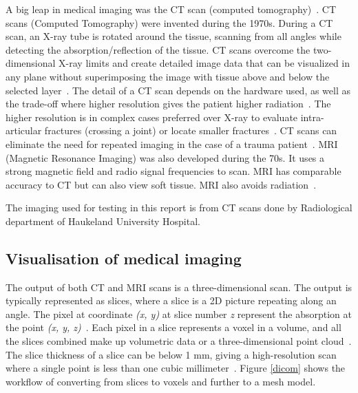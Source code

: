 \documentclass[a4paper]{report}
\begin{document}
A big leap in medical imaging was the CT scan (computed tomography)~\cite{bradley_history_2008}.
CT scans (Computed Tomography) were invented during the 1970s. During a CT scan, an X-ray tube is rotated around the tissue, scanning from all angles while detecting the absorption/reflection of the tissue. CT scans overcome the two-dimensional X-ray limits and create detailed image data that can be visualized in any plane without superimposing the image with tissue above and below the selected layer~\cite{hamblen_outline_2010}. The detail of a CT scan depends on the hardware used, as well as the trade-off where higher resolution gives the patient higher radiation~\cite{bradley_history_2008}. The higher resolution is in complex cases preferred over X-ray to evaluate intra-articular fractures (crossing a joint) or locate smaller fractures~\cite{ebnezar_textbook_2016}.
CT scans can eliminate the need for repeated imaging in the case of a trauma patient~\cite{swiontkowski_manual_2013}.
MRI (Magnetic Resonance Imaging) was also developed during the 70s. It uses a strong magnetic field and radio signal frequencies to scan. MRI has comparable accuracy to CT but can also view soft tissue. MRI also avoids radiation~\cite{swiontkowski_manual_2013}.


The imaging used for testing in this report is from CT scans done by Radiological department of Haukeland University Hospital.

\subsection{Visualisation of medical imaging}


The output of both CT and MRI scans is a three-dimensional scan. The output is typically represented as slices, where a slice is a 2D picture repeating along an angle. The pixel at coordinate \emph{(x, y)} at slice number \emph{z} represent the absorption at the point \emph{(x, y, z)}~\cite{chougule_conversions_2013}.
Each pixel in a slice represents a voxel in a volume, and all the slices combined make up volumetric data or a three-dimensional point cloud~\cite{chougule_conversions_2013}.
The slice thickness of a slice can be below 1 mm, giving a high-resolution scan where a single point is less than one cubic millimeter~\cite{hamblen_outline_2010}. Figure \ref{dicom} shows the workflow of converting from slices to voxels and further to a mesh model.
\end{document}
